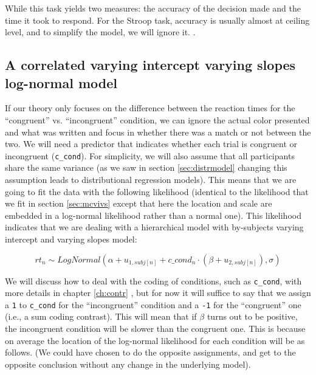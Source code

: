 \documentclass[12pt,]{krantz}
\theoremstyle{definition}
\theoremstyle{definition}
\theoremstyle{definition}
\theoremstyle{remark}
\begin{document}
While this task yields two measures: the accuracy of the decision made
and the time it took to respond. For the Stroop task, accuracy is
usually almost at ceiling level, and to simplify the model, we will
ignore it. \citep[See][ for a cognitive model that incorporates accuracy
and reaction times in the same model to analyze the same Stroop
data]{Nicenboim2018StanCon}.

\subsection{A correlated varying intercept varying slopes log-normal
model}\label{a-correlated-varying-intercept-varying-slopes-log-normal-model}

If our theory only focuses on the difference between the reaction times
for the ``congruent'' vs. ``incongruent'' condition, we can ignore the
actual color presented and what was written and focus in whether there
was a match or not between the two. We will need a predictor that
indicates whether each trial is congruent or incongruent
(\texttt{c\_cond}). For simplicity, we will also assume that all
participants share the same variance (as we saw in section
\ref{sec:distrmodel} changing this assumption leads to distributional
regression models). This means that we are going to fit the data with
the following likelihood (identical to the likelihood that we fit in
section \ref{sec:mcvivs} except that here the location and scale are
embedded in a log-normal likelihood rather than a normal one). This
likelihood indicates that we are dealing with a hierarchical model with
by-subjects varying intercept and varying slopes model:

\begin{equation}
  rt_n \sim LogNormal(\alpha + u_{1,subj[n]}  + c\_cond_n \cdot  (\beta + u_{2,subj[n]}), \sigma)
\end{equation}

We will discuss how to deal with the coding of conditions, such as
\texttt{c\_cond}, with more details in chapter \ref{ch:contr} \citep[and
see also][ for the mathematics underlying different kinds of
contrasts]{schadHowCapitalizePriori2020}, but for now it will suffice to
say that we assign a \texttt{1} to \texttt{c\_cond} for the
``incongruent'' condition and a \texttt{-1} for the ``congruent'' one
(i.e., a sum coding contrast). This will mean that if \(\beta\) turns
out to be positive, the incongruent condition will be slower than the
congruent one. This is because on average the location of the log-normal
likelihood for each condition will be as follows. (We could have chosen
to do the opposite assignments, and get to the opposite conclusion
without any change in the underlying model).
\end{document}
